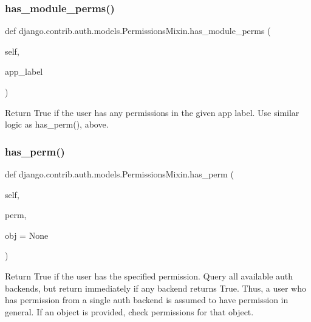 \subsubsection{\texorpdfstring{has\+\_\+module\+\_\+perms()}{has\_module\_perms()}}
{\footnotesize\ttfamily def django.\+contrib.\+auth.\+models.\+Permissions\+Mixin.\+has\+\_\+module\+\_\+perms (\begin{DoxyParamCaption}\item[{}]{self,  }\item[{}]{app\+\_\+label }\end{DoxyParamCaption})}

\begin{DoxyVerb}Return True if the user has any permissions in the given app label.
Use similar logic as has_perm(), above.
\end{DoxyVerb}
 \mbox{\label{classdjango_1_1contrib_1_1auth_1_1models_1_1_permissions_mixin_a37141152b9d3fe8bfb73f593c000c430}} 
\subsubsection{\texorpdfstring{has\+\_\+perm()}{has\_perm()}}
{\footnotesize\ttfamily def django.\+contrib.\+auth.\+models.\+Permissions\+Mixin.\+has\+\_\+perm (\begin{DoxyParamCaption}\item[{}]{self,  }\item[{}]{perm,  }\item[{}]{obj = {\ttfamily None} }\end{DoxyParamCaption})}

\begin{DoxyVerb}Return True if the user has the specified permission. Query all
available auth backends, but return immediately if any backend returns
True. Thus, a user who has permission from a single auth backend is
assumed to have permission in general. If an object is provided, check
permissions for that object.
\end{DoxyVerb}
 \mbox{\label{classdjango_1_1contrib_1_1auth_1_1models_1_1_permissions_mixin_ab3a72b420cd5ee2f27095ca4dd972497}} 

